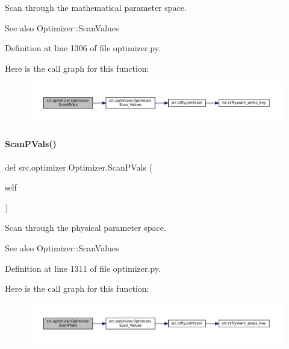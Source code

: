 Scan through the mathematical parameter space. 

\begin{DoxySeeAlso}{See also}
Optimizer\+::\+Scan\+Values 
\end{DoxySeeAlso}


Definition at line 1306 of file optimizer.\+py.

Here is the call graph for this function\+:
\nopagebreak
\begin{figure}[H]
\begin{center}
\leavevmode
\includegraphics[width=350pt]{classsrc_1_1optimizer_1_1Optimizer_a23cdd9fad58bbc9a6f5659ed3bbededc_cgraph}
\end{center}
\end{figure}
\mbox{\label{classsrc_1_1optimizer_1_1Optimizer_ad139c2963ecdfbf3abbce6027dfb9ac9}} 
\paragraph{\texorpdfstring{Scan\+P\+Vals()}{ScanPVals()}}
{\footnotesize\ttfamily def src.\+optimizer.\+Optimizer.\+Scan\+P\+Vals (\begin{DoxyParamCaption}\item[{}]{self }\end{DoxyParamCaption})}



Scan through the physical parameter space. 

\begin{DoxySeeAlso}{See also}
Optimizer\+::\+Scan\+Values 
\end{DoxySeeAlso}


Definition at line 1311 of file optimizer.\+py.

Here is the call graph for this function\+:
\nopagebreak
\begin{figure}[H]
\begin{center}
\leavevmode
\includegraphics[width=350pt]{classsrc_1_1optimizer_1_1Optimizer_ad139c2963ecdfbf3abbce6027dfb9ac9_cgraph}
\end{center}
\end{figure}
\mbox{\label{classsrc_1_1optimizer_1_1Optimizer_aff37f4cc60afa2eced61c258e4eed859}} 
